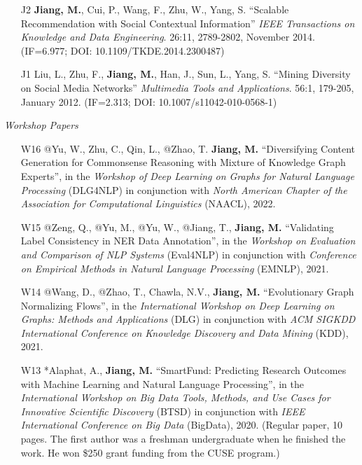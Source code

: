 \documentclass[10pt]{article}
\newenvironment{myindentpar}[1]%
{\begin{list}{}%
         {\setlength{\leftmargin}{#1}}%
         \item[]%
}
{\end{list}}
\newcounter{list}
\begin{document}
\begin{myindentpar}{0.00cm}
\begin{enumerate}[leftmargin=.5cm]
\item[J2] \textbf{Jiang, M.}, Cui, P., Wang, F., Zhu, W., Yang, S. ``Scalable Recommendation with Social Contextual Information'' \textit{IEEE Transactions on Knowledge and Data Engineering}. 26:11, 2789-2802, November 2014. (IF=6.977; DOI: 10.1109/TKDE.2014.2300487)

\item[J1] Liu, L., Zhu, F., \textbf{Jiang, M.}, Han, J., Sun, L., Yang, S. ``Mining Diversity on Social Media Networks'' \textit{Multimedia Tools and Applications}. 56:1, 179-205, January 2012. (IF=2.313; DOI: 10.1007/s11042-010-0568-1)

\end{enumerate}

\hspace{-0.25cm}\textit{Workshop Papers}

\begin{enumerate}[leftmargin=.5cm]

\item[W16] @Yu, W., Zhu, C., Qin, L., @Zhao, T. \textbf{Jiang, M.} ``Diversifying Content Generation for Commonsense Reasoning with Mixture of Knowledge Graph Experts'', in the \textit{Workshop of Deep Learning on Graphs for Natural Language Processing} (DLG4NLP) in conjunction with \textit{North American Chapter of the Association for Computational Linguistics} (NAACL), 2022.
		
\item[W15] @Zeng, Q., @Yu, M., @Yu, W., @Jiang, T., \textbf{Jiang, M.} ``Validating Label Consistency in NER Data Annotation'', in the \textit{Workshop on Evaluation and Comparison of NLP Systems} (Eval4NLP) in conjunction with \textit{Conference on Empirical Methods in Natural Language Processing} (EMNLP), 2021.

\item[W14] @Wang, D., @Zhao, T., Chawla, N.V., \textbf{Jiang, M.} ``Evolutionary Graph Normalizing Flows'', in the \textit{International Workshop on Deep Learning on Graphs: Methods and Applications} (DLG) in conjunction with \textit{ACM SIGKDD International Conference on Knowledge Discovery and Data Mining} (KDD), 2021.

\item[W13] *Alaphat, A., \textbf{Jiang, M.} ``SmartFund: Predicting Research Outcomes with Machine Learning and Natural Language Processing'', in the \textit{International Workshop on Big Data Tools, Methods, and Use Cases for Innovative Scientific Discovery} (BTSD) in conjunction with \textit{IEEE International Conference on Big Data} (BigData), 2020. (Regular paper, 10 pages. The first author was a freshman undergraduate when he finished the work. He won \$250 grant funding from the CUSE program.)


\end{enumerate}
\end{myindentpar}
\end{document}
